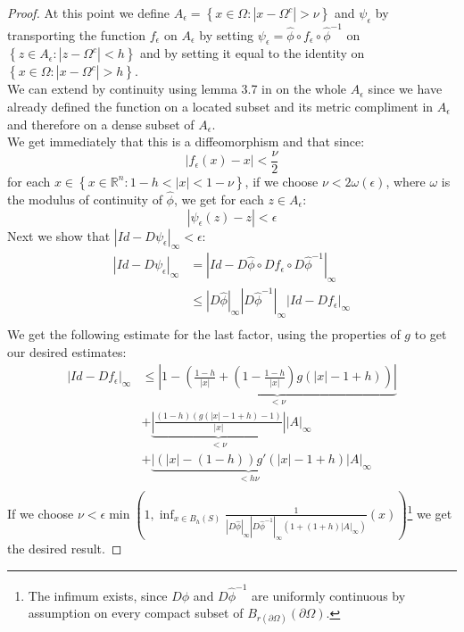 \documentclass[11pt,a4paper,leqno]{report}
\numberwithin{equation}{chapter}
\begin{document}
\begin{proof}
At this point we define $A_\epsilon=\left\{x\in\Omega: |x-\Omega^c|>\nu\right\}$ and $\psi_\epsilon$ by transporting the function $f_\epsilon$ on $A_\epsilon$ by setting $\psi_\epsilon=\hat{\phi}\circ f_\epsilon\circ\hat{\phi}^{-1}$ on $\left\{z\in A_\epsilon: |z-\Omega^c|<h\right\}$ and by setting it equal to the identity on $\left\{x\in\Omega: |x-\Omega^c|>h\right\}$.\\ We can extend by continuity using lemma 3.7 in \cite[p. 91]{CANA} on the whole $A_\epsilon$ since we have already defined the function on a located subset and its metric compliment in $A_\epsilon$ and therefore on a dense subset of $A_\epsilon$.\\
We get immediately that this is a diffeomorphism and that since:
\begin{equation*}|f_\epsilon(x)-x|<\frac{\nu}{2}\end{equation*}
for each $x\in\left\{x\in\mathbb{R}^n: 1-h<|x|<1-\nu\right\}$, if we choose $\nu<2\omega(\epsilon)$, where $\omega$ is the modulus of continuity of $\hat{\phi}$, we get for each $z\in A_\epsilon$:
\begin{equation*}|\psi_\epsilon(z)-z|<\epsilon\end{equation*}
Next we show that $|Id-D\psi_\epsilon|_\infty<\epsilon$:
\begin{align*} |Id-D\psi_\epsilon|_\infty&=|Id-D\hat{\phi}\circ Df_\epsilon\circ D\hat{\phi}^{-1}|_\infty\\
&\leq|D\hat{\phi}|_\infty|D\hat{\phi}^{-1}|_\infty|Id- Df_\epsilon|_\infty\\
\end{align*} 
We get the following estimate for the last factor, using the properties of $g$ to get our desired estimates:
\begin{align*} |Id- Df_\epsilon|_\infty&\leq\underset{<\nu}{\underbrace{|1-(\frac{1-h}{|x|}+(1-\frac{1-h}{|x|})g(|x|-1+h))|}}\\
&+\underset{<\nu}{\underbrace{|\frac{(1-h)(g(|x|-1+h)-1)}{|x|}|}}|A|_\infty\\&+\underset{<h\nu}{\underbrace{|(|x|-(1-h))g\prime(|x|-1+h)}}|A|_\infty\\
\end{align*}
If we choose $\nu<\epsilon\min(1,\inf_{x\in B_h(S)}\frac{1}{|D\hat{\phi}|_\infty|D\hat{\phi}^{-1}|_\infty(1+(1+h)|A|_\infty)}(x))$\footnote{The infimum exists, since $D\hat{\phi}$ and $D\hat{\phi}^{-1}$ are uniformly continuous by assumption on every compact subset of $B_{r(\partial\Omega)}(\partial\Omega)$.} we get the desired result.



\end{proof}
\end{document}
